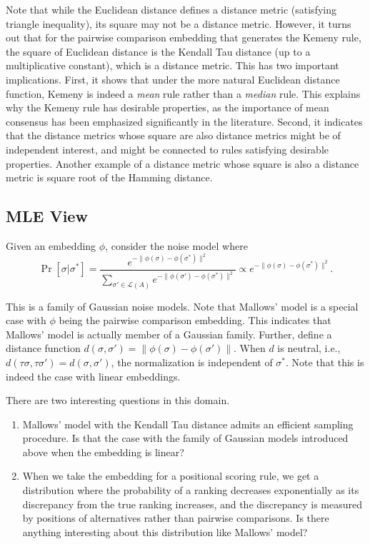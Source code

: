 \documentclass[10pt,letterpaper]{article}
\newcommand{\calL}{{\mathcal{L}}}
\newcommand{\rank}{{\calL(A)}}
\begin{document}
Note that while the Euclidean distance defines a distance metric (satisfying triangle inequality), its square may not be a distance metric. However, it turns out that for the pairwise comparison embedding that generates the Kemeny rule, the square of Euclidean distance is the Kendall Tau distance (up to a multiplicative constant), which is a distance metric. This has two important implications. First, it shows that under the more natural Euclidean distance function, Kemeny is indeed a \emph{mean} rule rather than a \emph{median} rule. This explains why the Kemeny rule has desirable properties, as the importance of mean consensus has been emphasized significantly in the literature. Second, it indicates that the distance metrics whose square are also distance metrics might be of independent interest, and might be connected to rules satisfying desirable properties. Another example of a distance metric whose square is also a distance metric is square root of the Hamming distance.


\subsection{MLE View}
Given an embedding $\phi$, consider the noise model where 
$$
\Pr[\sigma | \sigma^*] = \frac{e^{-\|\phi(\sigma)-\phi(\sigma^*)\|^2}}{\sum_{\sigma' \in \rank} e^{-\|\phi(\sigma')-\phi(\sigma^*)\|^2}} \propto e^{-\|\phi(\sigma)-\phi(\sigma^*)\|^2}.
$$

This is a family of Gaussian noise models. Note that Mallows' model is a special case with $\phi$ being the pairwise comparison embedding. This indicates that Mallows' model is actually member of a Gaussian family. Further, define a distance function $d(\sigma,\sigma') = \|\phi(\sigma)-\phi(\sigma')\|$. When $d$ is neutral, i.e., $d(\tau \sigma,\tau \sigma') = d(\sigma,\sigma')$, the normalization is independent of $\sigma^*$. Note that this is indeed the case with linear embeddings. 

There are two interesting questions in this domain.
\begin{enumerate}
\item Mallows' model with the Kendall Tau distance admits an efficient sampling procedure. Is that the case with the family of Gaussian models introduced above when the embedding is linear? 
\item When we take the embedding for a positional scoring rule, we get a distribution where the probability of a ranking decreases exponentially as its discrepancy from the true ranking increases, and the discrepancy is measured by positions of alternatives rather than pairwise comparisons. Is there anything interesting about this distribution like Mallows' model?
\end{enumerate}
\end{document}
